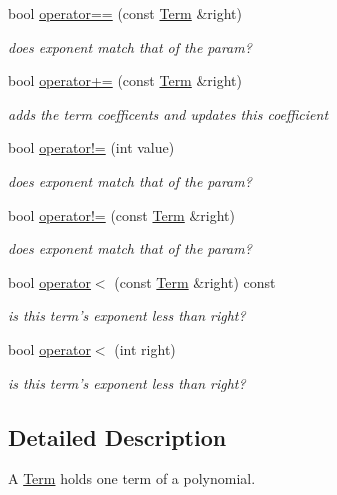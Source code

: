 \begin{DoxyCompactItemize}
bool \hyperlink{classTerm_a22d1367b67d2c2d2762392463decde13}{operator==} (const \hyperlink{classTerm}{Term} \&right)
\begin{DoxyCompactList}\small\item\em does exponent match that of the param? \end{DoxyCompactList}\item 
bool \hyperlink{classTerm_a5af142be15fea4c5c933b75c3151bfe8}{operator+=} (const \hyperlink{classTerm}{Term} \&right)
\begin{DoxyCompactList}\small\item\em adds the term coefficents and updates this coefficient \end{DoxyCompactList}\item 
bool \hyperlink{classTerm_a1c27415f2852a3685cedd20fceac6f37}{operator!=} (int value)
\begin{DoxyCompactList}\small\item\em does exponent match that of the param? \end{DoxyCompactList}\item 
bool \hyperlink{classTerm_afa3f759f8bf094001d4b979999e40696}{operator!=} (const \hyperlink{classTerm}{Term} \&right)
\begin{DoxyCompactList}\small\item\em does exponent match that of the param? \end{DoxyCompactList}\item 
bool \hyperlink{classTerm_a34755dc6c3b6084fb864bdad671be087}{operator$<$} (const \hyperlink{classTerm}{Term} \&right) const 
\begin{DoxyCompactList}\small\item\em is this term's exponent less than right? \end{DoxyCompactList}\item 
bool \hyperlink{classTerm_a44f5d686c50172e689cf86b2c77bbc6a}{operator$<$} (int right)
\begin{DoxyCompactList}\small\item\em is this term's exponent less than right? \end{DoxyCompactList}\end{DoxyCompactItemize}


\subsection{Detailed Description}
A \hyperlink{classTerm}{Term} holds one term of a polynomial. 

